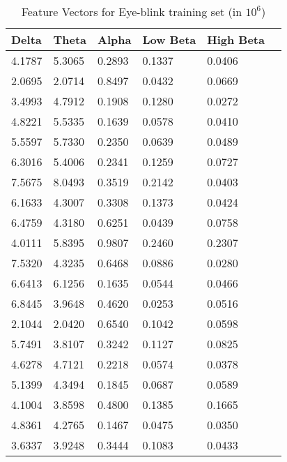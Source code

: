\documentclass[11pt]{amsart}
\begin{document}
\begin{table}[]
\centering
\caption{Feature Vectors for Eye-blink training set (in $10^6$)}
\label{Eye-blink}
\begin{tabular}{llllll}
\hline
    Delta	 &Theta &Alpha &Low Beta &High Beta\\ \hline
    4.1787    &5.3065    &0.2893   &0.1337     &0.0406\\
    2.0695    &2.0714    &0.8497    &0.0432    &0.0669\\
    3.4993    &4.7912    &0.1908   &0.1280     &0.0272\\
    4.8221    &5.5335    &0.1639    &0.0578    &0.0410\\
    5.5597    &5.7330    &0.2350    &0.0639    &0.0489\\
    6.3016    &5.4006    &0.2341    &0.1259    &0.0727\\
    7.5675    &8.0493    &0.3519    &0.2142    &0.0403\\
    6.1633    &4.3007    &0.3308    &0.1373    &0.0424\\
    6.4759    &4.3180    &0.6251    &0.0439    &0.0758\\
    4.0111    &5.8395    &0.9807    &0.2460    &0.2307\\
    7.5320    &4.3235    &0.6468    &0.0886    &0.0280\\
    6.6413    &6.1256    &0.1635    &0.0544    &0.0466\\
    6.8445    &3.9648    &0.4620    &0.0253    &0.0516\\
    2.1044    &2.0420    &0.6540    &0.1042    &0.0598\\
    5.7491    &3.8107    &0.3242    &0.1127    &0.0825\\
    4.6278    &4.7121    &0.2218    &0.0574    &0.0378\\
    5.1399    &4.3494    &0.1845    &0.0687    &0.0589\\
    4.1004    &3.8598    &0.4800    &0.1385    &0.1665\\
    4.8361    &4.2765    &0.1467    &0.0475    &0.0350\\
    3.6337    &3.9248    &0.3444    &0.1083    &0.0433
\end{tabular}
\end{table}
\end{document}

